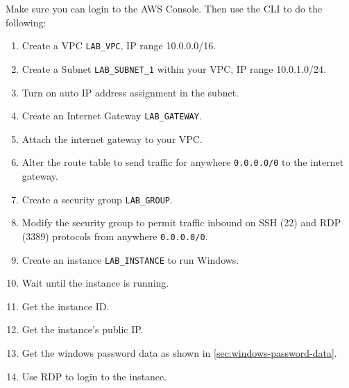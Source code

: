 \documentclass{pgnotes}
\begin{document}
Make sure you can login to the AWS Console.
Then use the CLI to do the following:
\begin{enumerate}
\item Create a VPC \texttt{LAB\_VPC}, IP range 10.0.0.0/16.
\item Create a Subnet \texttt{LAB\_SUBNET\_1} within your VPC, IP range 10.0.1.0/24.
\item Turn on auto IP address assignment in the subnet.
\item Create an Internet Gateway \texttt{LAB\_GATEWAY}.
\item Attach the internet gateway to your VPC.
\item Alter the route table to send traffic for anywhere \texttt{0.0.0.0/0} to the internet gateway.
\item Create a security group \texttt{LAB\_GROUP}.
\item Modify the security group to permit traffic inbound on SSH (22) and RDP (3389) protocols from anywhere \texttt{0.0.0.0/0}.
\item Create an instance \texttt{LAB\_INSTANCE} to run Windows.
\item Wait until the instance is running.
\item Get the instance ID.
\item Get the instance's public IP.
\item Get the windows password data as shown in \autoref{sec:windows-password-data}.
\item Use RDP to login to the instance.
\end{enumerate}
\end{document}
